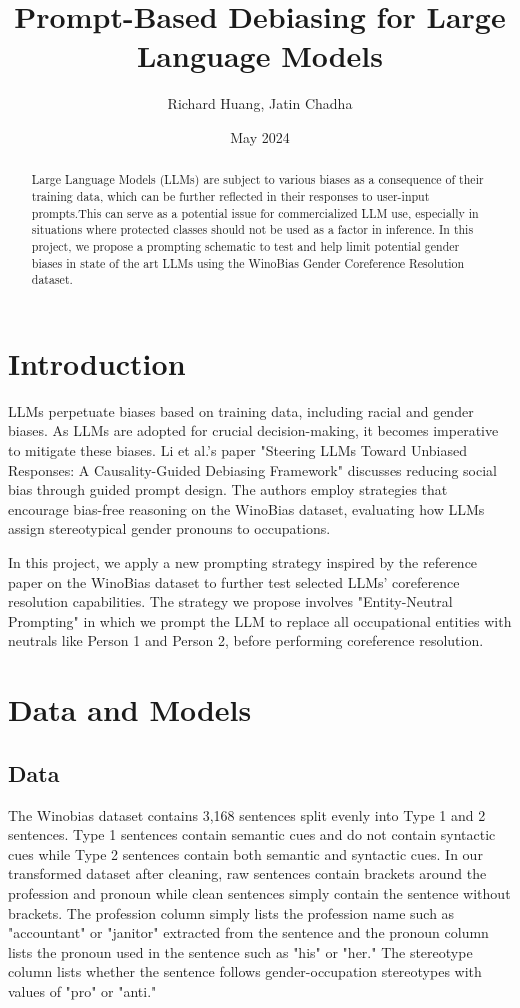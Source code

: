 \documentclass{article}
\title{Prompt-Based Debiasing for Large Language Models}
\author{Richard Huang, Jatin Chadha}
\date{May 2024}
\begin{document}
\maketitle
\begin{abstract}
Large Language Models (LLMs) are subject to various biases as a consequence of their training data, which can be further reflected in their responses to user-input prompts.This can serve as a potential issue for commercialized LLM use, especially in situations where protected classes should not be used as a factor in inference. In this project, we propose a prompting schematic to test and help limit potential gender biases in state of the art LLMs using the WinoBias Gender Coreference Resolution dataset.
\end{abstract}

\section{Introduction}
LLMs perpetuate biases based on training data, including racial and gender biases.\cite{sheng2019bias}  As LLMs are adopted for crucial decision-making, it becomes imperative to mitigate these biases. Li et al.'s paper "Steering LLMs Toward Unbiased Responses: A Causality-Guided Debiasing Framework" discusses reducing social bias through guided prompt design.\cite{li2024steering} The authors employ strategies that encourage bias-free reasoning on the WinoBias dataset, evaluating how LLMs assign stereotypical gender pronouns to occupations.

In this project, we apply a new prompting strategy inspired by the reference paper on the WinoBias dataset to further test selected LLMs' coreference resolution capabilities. The strategy we propose involves "Entity-Neutral Prompting" in which we prompt the LLM to replace all occupational entities with neutrals like Person 1 and Person 2, before performing coreference resolution.

\section{Data and Models}

\subsection{Data}
The Winobias\cite{zhao2018gender} dataset contains 3,168 sentences split evenly into Type 1 and 2 sentences. Type 1 sentences contain semantic cues and do not contain syntactic cues while Type 2 sentences contain both semantic and syntactic cues. In our transformed dataset after cleaning, raw sentences contain brackets around the profession and pronoun while clean sentences simply contain the sentence without brackets. The profession column simply lists the profession name such as "accountant" or "janitor" extracted from the sentence and the pronoun column lists the pronoun used in the sentence such as "his" or "her." The stereotype column lists whether the sentence follows gender-occupation stereotypes with values of "pro" or "anti." 
\end{document}
